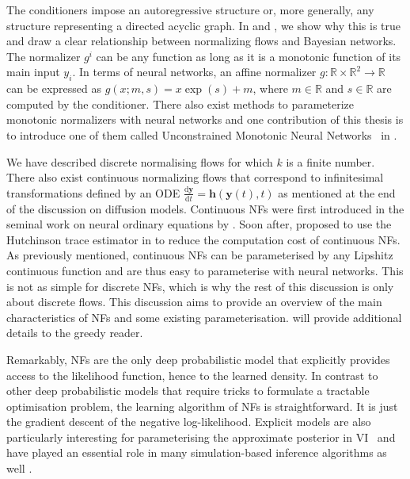 The conditioners impose an autoregressive structure or, more generally, any structure representing a directed acyclic graph. In  and , we show why this is true and draw a clear relationship between normalizing flows and Bayesian networks. The normalizer $g^i$ can be any function as long as it is a monotonic function of its main input $y_i$. In terms of neural networks, an affine normalizer $g: \mathbb{R} \times \mathbb{R}^2 \rightarrow \mathbb{R}$ can be expressed as
$g(x;m, s) = x\exp(s) + m$, where $m \in \mathbb{R}$ and $s \in \mathbb{R}$ are computed by the conditioner. There also exist methods to parameterize monotonic normalizers \citep{huang_neural_2018, de_cao_block_2020, durkan_neural_2019, jaini_sum--squares_2019} with neural networks and one contribution of this thesis is to introduce one of them called Unconstrained Monotonic Neural Networks~\citep[UMNNs, ][]{wehenkel_unconstrained_2019} in .

We have described discrete normalising flows for which $k$ is a finite number. There also exist continuous normalizing flows that correspond to infinitesimal transformations defined by an ODE $\frac{\text{d} \bm{y} }{\text{d}t} = \bm{h}(\bm{y}(t), t)$ as mentioned at the end of the discussion on diffusion models. Continuous NFs were first introduced in the seminal work on neural ordinary equations by \citet[NODE,][]{chen_neural_2018}. Soon after, \citet{grathwohl_ffjord_2018} proposed to use the Hutchinson trace estimator in  to reduce the computation cost of continuous NFs. As previously mentioned, continuous NFs can be parameterised by any Lipshitz continuous function and are thus easy to parameterise with neural networks. This is not as simple for discrete NFs, which is why the rest of this discussion is only about discrete flows. This discussion aims to provide an overview of the main characteristics of NFs and some existing parameterisation. \citet{papamakarios_normalizing_2019, kobyzev_normalizing_2020} will provide additional details to the greedy reader.

Remarkably, NFs are the only deep probabilistic model that explicitly provides access to the likelihood function, hence to the learned density. In contrast to other deep probabilistic models that require tricks to formulate a tractable optimisation problem, the learning algorithm of NFs is straightforward. It is just the gradient descent of the negative log-likelihood. Explicit models are also particularly interesting for parameterising the approximate posterior in VI~\citep{rezende2015variational} and have played an essential role in many simulation-based inference algorithms as well \citep{papamakarios_sequential_2019, greenberg_automatic_2019}.

